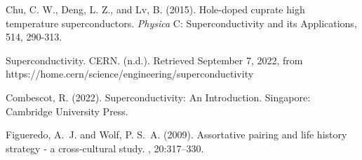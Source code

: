 \documentclass[twoside,twocolumn]{article}
\begin{document}
\begin{thebibliography}{99} %

Chu, C. W., Deng, L. Z., and Lv, B. (2015). Hole-doped cuprate high temperature superconductors. {\em Physica} C: Superconductivity and its Applications, 514, 290-313.

Superconductivity. CERN. (n.d.). Retrieved September 7, 2022, from https://home.cern/science/engineering/superconductivity 

\bibitem[Combescot, 2022]{}Combescot, R. (2022). Superconductivity: An Introduction. Singapore: Cambridge University Press.

Figueredo, A.~J. and Wolf, P. S.~A. (2009).
\newblock Assortative pairing and life history strategy - a cross-cultural
  study.
, 20:317--330.
 
\end{thebibliography}

\end{document}
